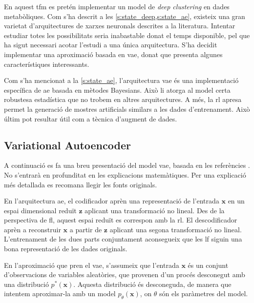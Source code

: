 \documentclass[CAT,BIB]{TFUOC}%
\begin{document}
    En aquest \gls{tfm}
    es pretén implementar un model de \textit{deep clustering} en dades metabòliques.
    Com s'ha descrit a les \cref{s:state_deep,s:state_ae},
    existeix una gran varietat d'arquitectures de xarxes neuronals descrites a la literatura.
    Intentar estudiar totes les possibilitats seria inabastable donat el temps disponible,
    pel que ha sigut necessari acotar l'estudi a una única arquitectura.
    S'ha decidit implementar una aproximació basada en \gls{vae},
    donat que presenta algunes característiques interessants.

    Com s'ha mencionat a la \cref{s:state_ae},
    l'arquitectura \gls{vae} és una implementació específica de \gls{ae}
    basada en mètodes Bayesians.
    Això li atorga al model certa robustesa estadística
    que no trobem en altres arquitectures.
    A més,
    la \gls{rl} apresa permet la generació de mostres artificials
    similars a les dades d'entrenament.
    Això últim pot resultar útil com a tècnica d'augment de dades.

    \subsection{Variational Autoencoder}
    \label{s:metodes_vae}

        A continuació es fa una breu presentació del model \gls{vae},
        basada en les referències \citep{Kingma2014,Kingma2019}.
        No s'entrarà en profunditat en les explicacions matemàtiques.
        Per una explicació més detallada es recomana llegir les fonts originals.

        En l'arquitectura \gls{ae},
        el codificador aprèn una representació de l'entrada $\mathbf{x}$
        en un espai dimensional reduït $\mathbf{z}$
        aplicant una transformació no lineal.
        Des de la perspectiva de \gls{fl},
        aquest espai reduït es correspon amb la \gls{rl}.
        El descodificador aprèn a reconstruir $\mathbf{x}$ a partir de $\mathbf{z}$
        aplicant una segona transformació no lineal.
        L'entrenament de les dues parts conjuntament
        aconsegueix que les \gls{lf} siguin una bona representació de les dades originals.

        En l'aproximació que pren el \gls{vae},
        s'assumeix que l'entrada $\mathbf{x}$ és un conjunt d'observacions de variables aleatòries,
        que provenen d'un procés desconegut
        amb una distribució $p^*(\mathbf{x})$.
        Aquesta distribució és desconeguda,
        de manera que intentem aproximar-la amb un model $p_\theta(\mathbf{x})$,
        on $\theta$ són els paràmetres del model.
\end{document}
